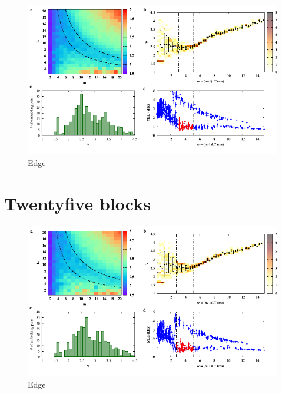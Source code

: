 \begin{figure}[H]
    \centering
    \includegraphics[width=\linewidth]{../20_blocks/2e5_points/plots/chaos_low.pdf}
    \caption{Edge}
    \label{fig:20 blocks chaos}
\end{figure}

\section{Twentyfive blocks}

\begin{figure}[H]
    \centering
    \includegraphics[width=\linewidth]{../25_blocks/edge/2e5_points/plots/chaos_low.pdf}
    \caption{Edge}
    \label{fig:25 blocks chaos}
\end{figure}

